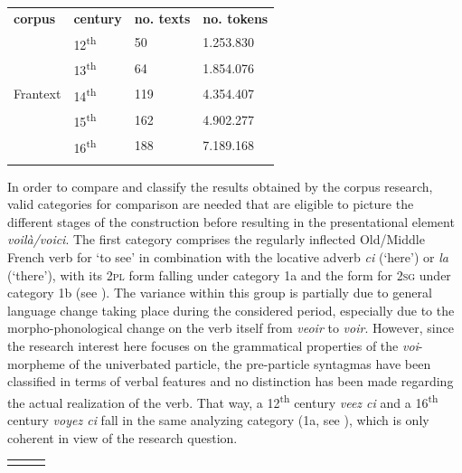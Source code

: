 \documentclass[output=paper]{langscibook}
\begin{document}
\begin{itemize}
\begin{itemize}
\begin{itemize}
\begin{itemize}
\begin{itemize}
\begin{itemize}
\begin{itemize}
\begin{tabularx}{\textwidth}{XXXX}
{\bfseries corpus} & {\bfseries century} & {\bfseries no. texts} & {\bfseries no. tokens}\\
\citealt{BFM2019} & 12\textsuperscript{th} & 50 & 1.253.830\\
\citealt{BFM2022} & 13\textsuperscript{th} & 64 & 1.854.076\\
Frantext & 14\textsuperscript{th} & 119 & 4.354.407\\
& 15\textsuperscript{th} & 162 & 4.902.277\\
& 16\textsuperscript{th} & 188 & 7.189.168\\
\lspbottomrule
\end{tabularx}
\begin{table}
\caption{Quantitative description of the subcorpora.}
\label{tab:key:1}
\end{table}

In order to compare and classify the results obtained by the corpus research, valid categories for comparison are needed that are eligible to picture the different stages of the construction before resulting in the presentational element \textit{voilà/voici}. The first category comprises the regularly inflected Old/Middle French verb for ‘to see’ in combination with the locative adverb \textit{ci} (‘here’) or \textit{la} (‘there’), with its \textsc{2pl} form falling under category 1a and the form for \textsc{2sg} under category 1b (see ). The variance within this group is partially due to general language change taking place during the considered period, especially due to the morpho-phonological change on the verb itself from \textit{veoir} to \textit{voir}. However, since the research interest here focuses on the grammatical properties of the \textit{voi}{}-morpheme of the univerbated particle, the pre-particle syntagmas have been classified in terms of verbal features and no distinction has been made regarding the actual realization of the verb. That way, a 12\textsuperscript{th} century \textit{veez ci} and a 16\textsuperscript{th} century \textit{voyez ci} fall in the same analyzing category (1a, see ), which is only coherent in view of the research question. 


\begin{tabularx}{\textwidth}{XXX}

\lsptoprule


\end{tabularx}
\end{itemize}
\end{itemize}
\end{itemize}
\end{itemize}
\end{itemize}
\end{itemize}
\end{itemize}
\end{document}

